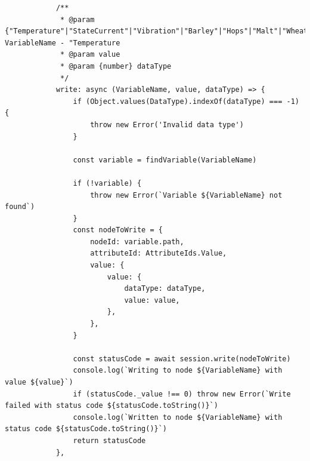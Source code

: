 \begin{center}
\begin{verbatim}
            /**
             * @param {"Temperature"|"StateCurrent"|"Vibration"|"Barley"|"Hops"|"Malt"|"Wheat"|"Yeast"|"FillingInventory"|"Counter"|"State"|"StopReason"|"ExecuteState"|"ExecuteOrder"|"BeerType"|"BeerAmount"|"MachineSpeed"|"BatchId"|"SetBatchId"} VariableName - "Temperature
             * @param value
             * @param {number} dataType
             */
            write: async (VariableName, value, dataType) => {
                if (Object.values(DataType).indexOf(dataType) === -1) {
                    throw new Error('Invalid data type')
                }

                const variable = findVariable(VariableName)

                if (!variable) {
                    throw new Error(`Variable ${VariableName} not found`)
                }
                const nodeToWrite = {
                    nodeId: variable.path,
                    attributeId: AttributeIds.Value,
                    value: {
                        value: {
                            dataType: dataType,
                            value: value,
                        },
                    },
                }

                const statusCode = await session.write(nodeToWrite)
                console.log(`Writing to node ${VariableName} with value ${value}`)
                if (statusCode._value !== 0) throw new Error(`Write failed with status code ${statusCode.toString()}`)
                console.log(`Written to node ${VariableName} with status code ${statusCode.toString()}`)
                return statusCode
            },


\end{verbatim}
\end{center}
